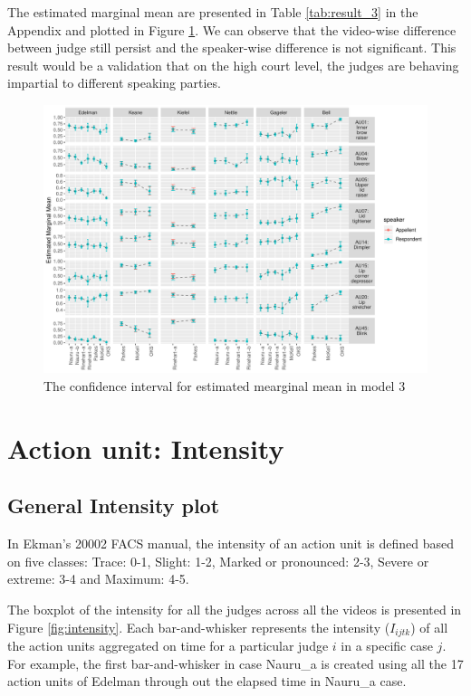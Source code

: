 \documentclass{monashthesis}
\begin{document}
The estimated marginal mean are presented in Table \ref{tab:result_3} in the Appendix and plotted in Figure \ref{fig:model3-plot}. We can observe that the video-wise difference between judge still persist and the speaker-wise difference is not significant. This result would be a validation that on the high court level, the judges are behaving impartial to different speaking parties.

\begin{figure}

{\centering \includegraphics[width=1\linewidth]{figures/model3-plot-1} 

}

\caption{The confidence interval for estimated mearginal mean in model 3}\label{fig:model3-plot}
\end{figure}

\hypertarget{action-unit-intensity}{%
\section{Action unit: Intensity}\label{action-unit-intensity}}

\hypertarget{general-intensity-plot}{%
\subsection{General Intensity plot}\label{general-intensity-plot}}

In Ekman's 20002 FACS manual, the intensity of an action unit is defined based on five classes: Trace: 0-1, Slight: 1-2, Marked or pronounced: 2-3, Severe or extreme: 3-4 and Maximum: 4-5.

The boxplot of the intensity for all the judges across all the videos is presented in Figure \ref{fig:intensity}. Each bar-and-whisker represents the intensity (\(I_{ijtk}\)) of all the action units aggregated on time for a particular judge \(i\) in a specific case \(j\). For example, the first bar-and-whisker in case Nauru\_a is created using all the 17 action units of Edelman through out the elapsed time in Nauru\_a case.
\end{document}
